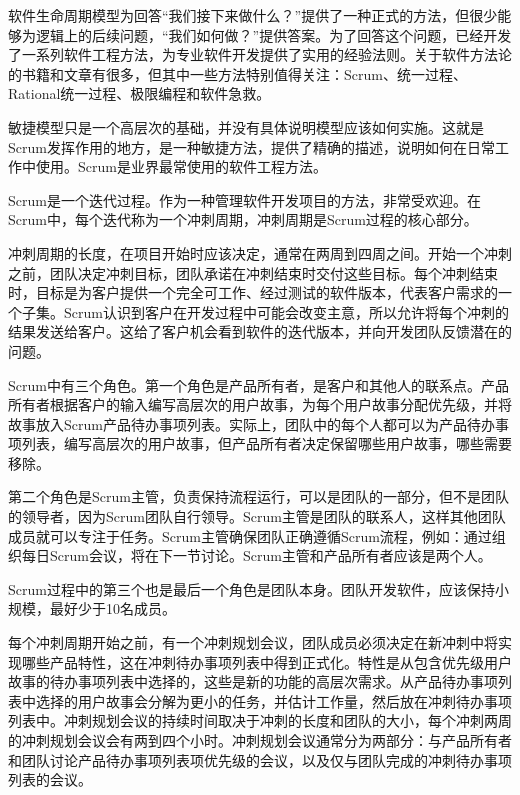 
软件生命周期模型为回答“我们接下来做什么？”提供了一种正式的方法，但很少能够为逻辑上的后续问题，“我们如何做？”提供答案。为了回答这个问题，已经开发了一系列软件工程方法，为专业软件开发提供了实用的经验法则。关于软件方法论的书籍和文章有很多，但其中一些方法特别值得关注：Scrum、统一过程、Rational统一过程、极限编程和软件急救。


敏捷模型只是一个高层次的基础，并没有具体说明模型应该如何实施。这就是Scrum发挥作用的地方，是一种敏捷方法，提供了精确的描述，说明如何在日常工作中使用。Scrum是业界最常使用的软件工程方法。

Scrum是一个迭代过程。作为一种管理软件开发项目的方法，非常受欢迎。在Scrum中，每个迭代称为一个冲刺周期，冲刺周期是Scrum过程的核心部分。

冲刺周期的长度，在项目开始时应该决定，通常在两周到四周之间。开始一个冲刺之前，团队决定冲刺目标，团队承诺在冲刺结束时交付这些目标。每个冲刺结束时，目标是为客户提供一个完全可工作、经过测试的软件版本，代表客户需求的一个子集。Scrum认识到客户在开发过程中可能会改变主意，所以允许将每个冲刺的结果发送给客户。这给了客户机会看到软件的迭代版本，并向开发团队反馈潜在的问题。


Scrum中有三个角色。第一个角色是产品所有者，是客户和其他人的联系点。产品所有者根据客户的输入编写高层次的用户故事，为每个用户故事分配优先级，并将故事放入Scrum产品待办事项列表。实际上，团队中的每个人都可以为产品待办事项列表，编写高层次的用户故事，但产品所有者决定保留哪些用户故事，哪些需要移除。

第二个角色是Scrum主管，负责保持流程运行，可以是团队的一部分，但不是团队的领导者，因为Scrum团队自行领导。Scrum主管是团队的联系人，这样其他团队成员就可以专注于任务。Scrum主管确保团队正确遵循Scrum流程，例如：通过组织每日Scrum会议，将在下一节讨论。Scrum主管和产品所有者应该是两个人。

Scrum过程中的第三个也是最后一个角色是团队本身。团队开发软件，应该保持小规模，最好少于10名成员。


每个冲刺周期开始之前，有一个冲刺规划会议，团队成员必须决定在新冲刺中将实现哪些产品特性，这在冲刺待办事项列表中得到正式化。特性是从包含优先级用户故事的待办事项列表中选择的，这些是新的功能的高层次需求。从产品待办事项列表中选择的用户故事会分解为更小的任务，并估计工作量，然后放在冲刺待办事项列表中。冲刺规划会议的持续时间取决于冲刺的长度和团队的大小，每个冲刺两周的冲刺规划会议会有两到四个小时。冲刺规划会议通常分为两部分：与产品所有者和团队讨论产品待办事项列表项优先级的会议，以及仅与团队完成的冲刺待办事项列表的会议。

